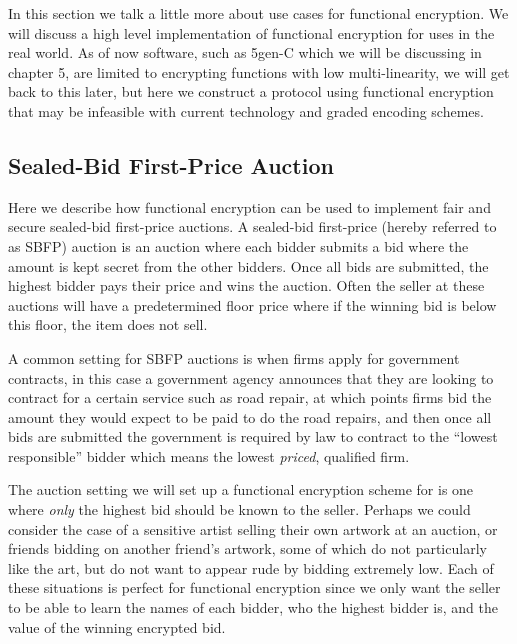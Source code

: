 \documentclass[12pt,twoside]{reedthesis}
\begin{document}
    
    In this section we talk a little more about use cases for functional encryption. We will discuss a high level implementation of functional encryption for uses in the real world. As of now software, such as 5gen-C which we will be discussing in chapter 5, are limited to encrypting functions with low multi-linearity, we will get back to this later, but here we construct a protocol using functional encryption that may be infeasible with current technology and graded encoding schemes.
    \subsection{Sealed-Bid First-Price Auction}
    Here we describe how functional encryption can be used to implement fair and secure sealed-bid first-price auctions. A sealed-bid first-price (hereby referred to as SBFP) auction is an auction where each bidder submits a bid where the amount is kept secret from the other bidders. Once all bids are submitted, the highest bidder pays their price and wins the auction. Often the seller at these auctions will have a predetermined floor price where if the winning bid is below this floor, the item does not sell. 
    \par A common setting for SBFP auctions is when firms apply for government contracts, in this case a government agency announces that they are looking to contract for a certain service such as road repair, at which points firms bid the amount they would expect to be paid to do the road repairs, and then once all bids are submitted the government is required by law to contract to the ``lowest responsible'' bidder which means the lowest \textit{priced}, qualified firm.
    \par The auction setting we will set up a functional encryption scheme for is one where \textit{only} the highest bid should be known to the seller. Perhaps we could consider the case of a sensitive artist selling their own artwork at an auction, or friends bidding on another friend's artwork, some of which do not particularly like the art, but do not want to appear rude by bidding extremely low. Each of these situations is perfect for functional encryption since we only want the seller to be able to learn the names of each bidder, who the highest bidder is, and the value of the winning encrypted bid. 
    
    
\end{document}
